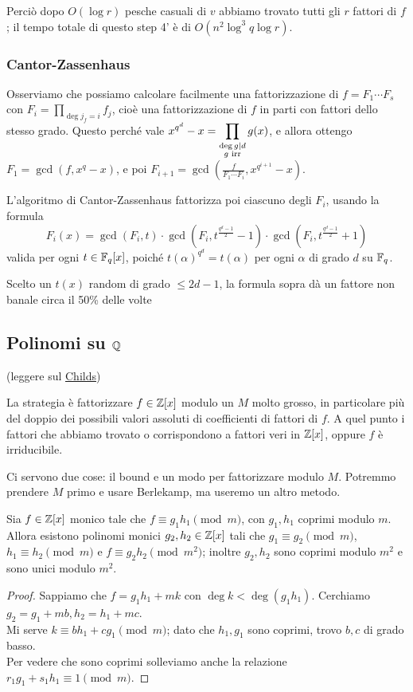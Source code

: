 \documentclass[a4paper]{book}
\begin{document}
    Perciò dopo $O(\log r)$ pesche casuali di $v$ abbiamo trovato tutti gli $r$ fattori di $f$; il tempo totale di questo step 4' è di $O(n^2\log^3q\log r)$.

    \subsubsection{Cantor-Zassenhaus}

    Osserviamo che possiamo calcolare facilmente una fattorizzazione di $f=F_1\cdots F_s$ con $F_i=\prod_{\deg j_f=i}f_j$, cioè una fattorizzazione di $f$ in parti con fattori dello stesso grado. Questo perché vale $\displaystyle x^{q^d}-x=\prod_{\substack{\deg g\mid d \\ g\text{ irr}}}g(x)$, e allora ottengo $F_1=\gcd(f,x^q-x)$, e poi $F_{i+1}=\gcd(\frac{f}{F_1\cdots F_i},x^{q^{i+1}}-x)$.

    L'algoritmo di Cantor-Zassenhaus fattorizza poi ciascuno degli $F_i$, usando la formula
    $$ F_i(x) = \gcd(F_i,t)\cdot \gcd(F_i, t^{\frac{q^d-1}{2}}-1)\cdot \gcd(F_i, t^{\frac{q^d-1}{2}}+1)$$
    valida per ogni $t\in\mathbb{F}_q[x]$, poiché $t(\alpha)^{q^d}=t(\alpha)$ per ogni $\alpha$ di grado $d$ su $\mathbb{F}_q$.

    Scelto un $t(x)$ random di grado $\le 2d-1$, la formula sopra dà un fattore non banale circa il 50\% delle volte

    \subsection{Polinomi su $\mathbb{Q}$}
    (leggere sul \href{http://people.dm.unipi.it/gianni/TC&C/Hensel.pdf}{Childs})

    La strategia è fattorizzare $f\in\mathbb{Z}[x]$ modulo un $M$ molto grosso, in particolare più del doppio dei possibili valori assoluti di coefficienti di fattori di $f$. A quel punto i fattori che abbiamo trovato o corrispondono a fattori veri in $\mathbb{Z}[x]$, oppure $f$ è irriducibile.

    Ci servono due cose: il bound e un modo per fattorizzare modulo $M$. Potremmo prendere $M$ primo e usare Berlekamp, ma useremo un altro metodo.

    \begin{lemma}
        Sia $f\in\mathbb{Z}[x]$ monico tale che $f\equiv g_1h_1\pmod m$, con $g_1,h_1$ coprimi modulo $m$.\\
        Allora esistono polinomi monici $g_2,h_2\in\mathbb{Z}[x]$ tali che $g_1\equiv g_2\pmod m$, $h_1\equiv h_2\pmod m$ e $f\equiv g_2h_2\pmod{m^2}$; inoltre $g_2,h_2$ sono coprimi modulo $m^2$ e sono unici modulo $m^2$.
    \end{lemma}
    \begin{proof}
        Sappiamo che $f=g_1h_1+mk$ con $\deg k<\deg(g_1h_1)$. Cerchiamo $g_2=g_1+mb, h_2=h_1+mc$.\\
        Mi serve $k\equiv bh_1+cg_1\pmod m$; dato che $h_1,g_1$ sono coprimi, trovo $b,c$ di grado basso.\\
        Per vedere che sono coprimi solleviamo anche la relazione $r_1g_1+s_1h_1\equiv 1\pmod m$.
    \end{proof}
\end{document}
